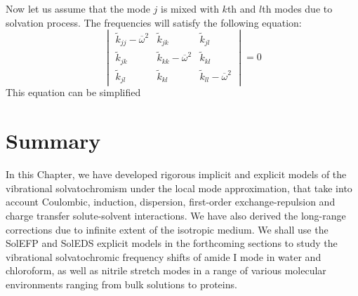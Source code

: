 \documentclass[a4paper,titlepage,twoside,fleqn,12pt]{book}
\begin{document}
\begin{refsection}
Now let us assume that the mode $j$ is mixed with $k$th and $l$th modes
due to solvation process. The frequencies will satisfy the following
equation:
%
\begin{equation}
\begin{vmatrix}
\tilde{k}_{jj} - \overline{\omega}^2 & \tilde{k}_{jk}                       & \tilde{k}_{jl}                       \\ 
\tilde{k}_{jk}                       & \tilde{k}_{kk} - \overline{\omega}^2 & \tilde{k}_{kl}                       \\ 
\tilde{k}_{jl}                       & \tilde{k}_{kl}                       & \tilde{k}_{ll} - \overline{\omega}^2
\end{vmatrix}
= 0
\end{equation}
%
This equation can be simplified



\section{Summary}

In this Chapter, we have developed rigorous implicit and
explicit models of the vibrational solvatochromism under
the local mode approximation, that take into account
Coulombic, induction, dispersion, first\hyp{}order 
exchange\hyp{}repulsion and charge transfer solute\hyp{}solvent
interactions. We have also derived the long\hyp{}range
corrections due to infinite extent of the isotropic medium. 
We shall use the SolEFP and SolEDS explicit models
in the forthcoming sections to study the vibrational solvatochromic
frequency shifts of amide I mode in water and chloroform, 
as well as nitrile stretch modes in a range of various molecular
environments ranging from bulk solutions to proteins.


%


\printbibliography[heading=subbibintoc,title={References}]
\end{refsection}
\end{document}
